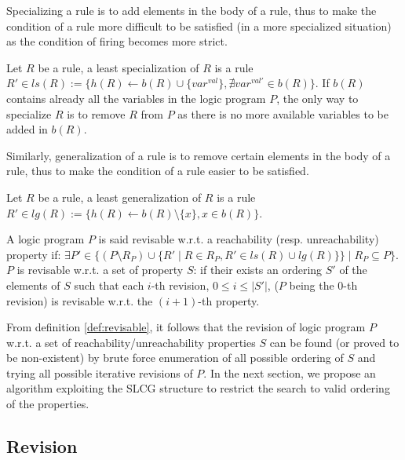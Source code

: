 Specializing a rule is to add elements in the body of a rule,
thus to make the condition of a rule more difficult to be satisfied (in a more specialized situation) as the condition of firing becomes more strict.

\begin{definition}
	Let $R$ be a rule, a least specialization of $R$ is a rule $R' \in ls(R) := \{h(R) \leftarrow b(R) \cup \{var^{val}\}, \nexists var^{val'} \in b(R)\}$.
	If $b(R)$ contains already all the variables in the logic program $P$, the only way to specialize $R$ is to remove $R$ from $P$ as there is no more available variables to be added in $b(R)$.
\end{definition}

    Similarly, generalization of a rule is to remove certain elements in the body of a rule, thus to make the condition of a rule easier to be satisfied.

\begin{definition}
	Let $R$ be a rule, a least generalization of $R$ is a rule $R' \in lg(R) := \{h(R) \leftarrow b(R) \setminus \{x\},  x \in b(R)\}$.
\end{definition}

\begin{definition}[Revisable]\label{def:revisable}
	A logic program $P$ is said revisable w.r.t. a reachability (resp. unreachability) property if:
	$\exists P' \in \{(P \setminus R_P) \cup \{R' \mid R \in R_P, R' \in ls(R) \cup lg(R)\} \} \mid R_P \subseteq P\}$.
	$P$ is revisable w.r.t. a set of property $S$:
	if their exists an ordering $S'$ of the elements of $S$ such that each $i$-th revision, $0 \leq i \leq |S'|$, ($P$ being the $0$-th revision) is revisable w.r.t. the $(i+1)$-th property.
\end{definition} 

From definition \ref{def:revisable}, it follows that the revision of logic program $P$ w.r.t. a set of reachability/unreachability properties $S$ can be found (or proved to be non-existent) by brute force enumeration of all possible ordering of $S$ and trying all possible iterative revisions of $P$.
In the next section, we propose an algorithm exploiting the SLCG structure to restrict the search to valid ordering of the properties.
\subsection{Revision}\label{sec:algorithm}

